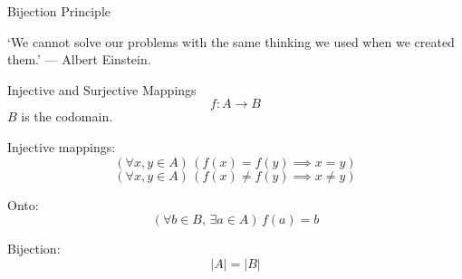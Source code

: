 \documentclass[12pt,a4paper]{article}
\begin{document}
\begin{center}
Bijection Principle
\end{center}

`We cannot solve our problems with the same thinking we used when we created them.'
--- Albert Einstein.

{\large Injective and Surjective Mappings}
\[f:A\to B\]
\(B\) is the codomain.

Injective mappings:
\[(\forall x,y\in A)\,(f(x)=f(y)\implies x=y)\]
\[(\forall x,y\in A)\,(f(x)\ne f(y)\implies x\ne y)\]

Onto:
\[(\forall b\in B,\,\exists a\in A)\,f(a)=b\]

Bijection:
\[|A|=|B|\]
\end{document}
